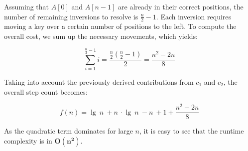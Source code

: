 \noindent
Assuming that $A[0]$ and $A[n-1]$ are already in their correct positions, the number of remaining inversions to resolve is $\frac{n}{2} - 1$.
Each inversion requires moving a key over a certain number of positions to the left.
To compute the overall cost, we sum up the necessary movements, which yields:

\[
    \sum_{i=1}^{\frac{n}{2} - 1} i = \frac{\frac{n}{2}(\frac{n}{2} - 1)}{2} = \frac{n^2 - 2n}{8}
\]

\noindent
Taking into account the previously derived contributions from $c_1$ and $c_2$, the overall step count becomes:

\[
    f(n) = \lg\ n\ + n\ \cdot \lg\ n\ - n\ + 1 +  \frac{n^2 - 2n}{8}
\]

As the quadratic term dominates for large $n$, it is easy to see that the runtime complexity is in $\boldsymbol{O(n^2)}$.